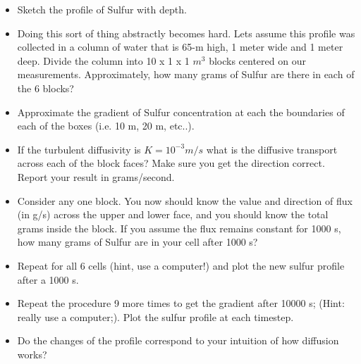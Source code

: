 \begin{itemize}
    \item Sketch the profile of Sulfur with depth.

    \item Doing this sort of thing abstractly becomes hard. Lets assume this profile was collected in a column of water that is 65-m high, 1 meter wide and 1 meter deep. Divide the column into 10 x 1 x 1 $m^3$ blocks centered on our measurements. Approximately, how many grams of Sulfur are there in each of the 6 blocks?
    \item Approximate the gradient of Sulfur concentration at each the boundaries of each of the boxes (i.e. 10 m, 20 m, etc..).

\item If the turbulent diffusivity is $K=10^{-3} m/s$
 what is the diffusive transport across each of the block faces? Make sure you get the direction correct. Report your result in grams/second.

\item Consider any one block. You now should know the value and direction of flux (in g/s) across the upper and lower face, and you should know the total grams inside the block. If you assume the flux remains constant for 1000 s, how many grams of Sulfur are in your cell after 1000 s?

\item Repeat for all 6 cells (hint, use a computer!) and plot the new sulfur profile after a 1000 s.

\item Repeat the procedure 9 more times to get the gradient after 10000 s; (Hint: really use a computer;). Plot the sulfur profile at each timestep.

\item Do the changes of the profile correspond to your intuition of how diffusion works?
\end{itemize}



